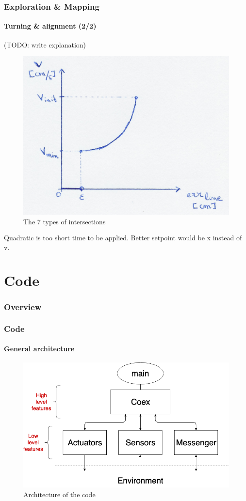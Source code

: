 \documentclass[10pt]{beamer}
\begin{document}
\begin{frame}
\frametitle{Exploration \& Mapping}
\framesubtitle{Turning \& alignment (2/2)}
(TODO: write explanation)
\begin{figure}[hbtp]
\centering
\includegraphics[scale=0.07]{figures/turn-align}
\caption{The 7 types of intersections}
\label{fig:type-intersection}
\end{figure}
Quadratic is too short time to be applied. Better setpoint would be x instead of v.
\end{frame}

\section{Code} 

\begin{frame}
\frametitle{Overview}
\tableofcontents[currentsection,subsectionstyle=shaded]
\end{frame}

\begin{frame}
\frametitle{Code}
\framesubtitle{General architecture}
\begin{figure}[hbtp]
\centering
\includegraphics[scale=0.38]{figures/architecture.png}
\caption{Architecture of the code}
\label{fig:architecture}
\end{figure}
\end{frame}
\end{document}
